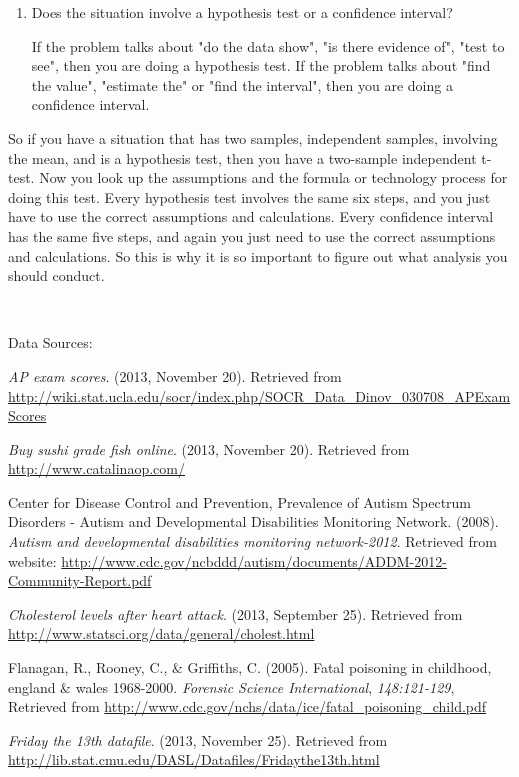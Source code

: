 \documentclass[]{book}
\begin{document}
\begin{enumerate}
\def\labelenumi{\arabic{enumi}.}
\setcounter{enumi}{3}
\item
  Does the situation involve a hypothesis test or a confidence interval?

  If the problem talks about "do the data show", "is there evidence of", "test to see", then you are doing a hypothesis test. If the problem talks about "find the value", "estimate the" or "find the interval", then you are doing a confidence interval.
\end{enumerate}

So if you have a situation that has two samples, independent samples, involving the mean, and is a hypothesis test, then you have a two-sample independent t-test. Now you look up the assumptions and the formula or technology process for doing this test. Every hypothesis test involves the same six steps, and you just have to use the correct assumptions and calculations. Every confidence interval has the same five steps, and again you just need to use the correct assumptions and calculations. So this is why it is so important to figure out what analysis you should conduct.

\textbf{\\
}

Data Sources:

\emph{AP exam scores}. (2013, November 20). Retrieved from
\url{http://wiki.stat.ucla.edu/socr/index.php/SOCR_Data_Dinov_030708_APExamScores}

\emph{Buy sushi grade fish online}. (2013, November 20). Retrieved from
\url{http://www.catalinaop.com/}

Center for Disease Control and Prevention, Prevalence of Autism Spectrum
Disorders - Autism and Developmental Disabilities Monitoring Network.
(2008). \emph{Autism and developmental disabilities monitoring network-2012}.
Retrieved from website:
\url{http://www.cdc.gov/ncbddd/autism/documents/ADDM-2012-Community-Report.pdf}

\emph{Cholesterol levels after heart attack}. (2013, September 25). Retrieved
from \url{http://www.statsci.org/data/general/cholest.html}

Flanagan, R., Rooney, C., \& Griffiths, C. (2005). Fatal poisoning in
childhood, england \& wales 1968-2000. \emph{Forensic Science International},
\emph{148:121-129}, Retrieved from
\url{http://www.cdc.gov/nchs/data/ice/fatal_poisoning_child.pdf}

\emph{Friday the 13th datafile}. (2013, November 25). Retrieved from
\url{http://lib.stat.cmu.edu/DASL/Datafiles/Fridaythe13th.html}
\end{document}
